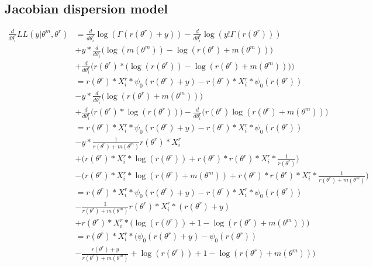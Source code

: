 \documentclass[bibliography=totoc,10pt]{scrartcl}
\begin{document}
\subsection{Jacobian dispersion model}
\begin{equation}
\begin{split}
\frac{d}{d \theta^r_i} LL(y|\theta^m, \theta^r) &= \frac{d}{d \theta^r_i} \log(\Gamma(r(\theta^r)+y)) - \frac{d}{d \theta^r_i} \log(y! \Gamma(r(\theta^r))) \\
&+ y * \frac{d}{d \theta^r_i} \bigg( \log(m(\theta^m)) -\log(r(\theta^r)+m(\theta^m)) \bigg) \\
&+ \frac{d}{d \theta^r_i} \bigg( r(\theta^r) * \bigg( \log(r(\theta^r)) - \log(r(\theta^r)+m(\theta^m)) \bigg) \bigg) \\
&= r(\theta^r) * X^r_{i} * \psi_0(r(\theta^r)+y) - r(\theta^r) * X^r_{i} * \psi_0(r(\theta^r)) \\
&- y*\frac{d}{d \theta^r_i} \bigg( \log(r(\theta^r)+m(\theta^m)) \bigg) \\
&+ \frac{d}{d \theta^r_i} \bigg( r(\theta^r)*\log(r(\theta^r)) \bigg) - \frac{d}{d \theta^r_i} \bigg( r(\theta^r) \log(r(\theta^r)+m(\theta^m)) \bigg) \\
&= r(\theta^r) * X^r_{i} * \psi_0(r(\theta^r)+y) - r(\theta^r) * X^r_{i} * \psi_0(r(\theta^r)) \\
&- y*\frac{1}{r(\theta^r)+m(\theta^m)} r(\theta^r) * X^r_{i}   \\
&+  \bigg( r(\theta^r) * X^r_{i}  * \log(r(\theta^r)) + r(\theta^r) * r(\theta^r) * X^r_{i}  * \frac{1}{r(\theta^r)} \bigg) \\
&- \bigg(r(\theta^r) * X^r_{i}  * \log(r(\theta^r)+m(\theta^m)) +  r(\theta^r) * r(\theta^r) * X^r_{i}  * \frac{1}{r(\theta^r)+m(\theta^m)} \bigg) \\
&= r(\theta^r) * X^r_{i} * \psi_0(r(\theta^r)+y)- r(\theta^r) * X^r_{i} * \psi_0(r(\theta^r)) \\
&- \frac{1}{r(\theta^r)+m(\theta^m)} r(\theta^r) * X^r_{i}  *(r(\theta^r) + y) \\
&+ r(\theta^r) * X^r_{i}  * \bigg( \log(r(\theta^r)) + 1 - \log(r(\theta^r)+m(\theta^m)) \bigg)  \\
&= r(\theta^r) * X^r_{i} * \bigg( \psi_0(r(\theta^r)+y)-\psi_0(r(\theta^r)) \\
&- \frac{r(\theta^r) + y}{r(\theta^r)+m(\theta^m)} + \log(r(\theta^r)) + 1 - \log(r(\theta^r)+m(\theta^m)) \bigg)  \\
\end{split}
\end{equation}
\end{document}
